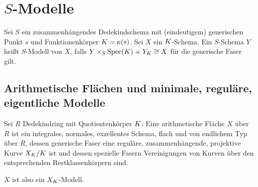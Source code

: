 \documentclass[german]{scrreprt}
\begin{document}

\chapter{$S$-Modelle}
\begin{Definition}[$S$-Modell]
  Sei $S$ ein zusammenhängendes Dedekindschema mit (eindeutigem)
  generischen Punkt $s$ und Funktionenkörper $K=\kappa(s)$.
  Sei $X$ ein $K$-Schema.
  Ein $S$-Schema $Y$ heißt $S$-Modell von $X$, falls
  $Y\times_S\operatorname{Spec}(K)=Y_K\cong X$ für die generische Faser gilt.
\end{Definition}


\section{Arithmetische Flächen und minimale, reguläre, eigentliche Modelle}
\begin{Definition}
  Sei $R$ Dedekindring mit Quotientenkörper $K$.
  Eine arithmetische Fläche $X$ über $R$ ist ein
  integrales, normales, exzellentes Schema, flach und von endlichem
  Typ über $R$,
  dessen generische Faser eine reguläre, zusammenhängende,
  projektive Kurve $X_{K}/K$ ist
  und dessen spezielle Fasern Vereinigungen von Kurven über den
  entsprechenden Restklassenkörpern sind.
  \cite[IV.4]{silverman2}
  
  $X$ ist also ein $X_{K}$-Modell.
\end{Definition}
\end{document}
